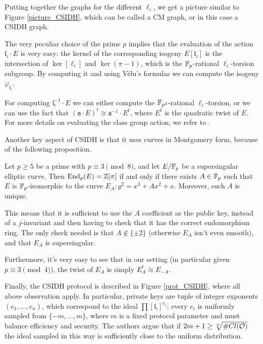 Putting together the graphs for the different $\ell_i$, we get a picture similar to Figure \ref{picture_CSIDH}, which can be called a CM graph, or in this case a CSIDH graph.

The very peculiar choice of the prime $p$ implies that the evaluation of the action $\mathfrak{l}_i\cdot E$ is very easy: the kernel of the corresponding isogeny $E[\mathfrak{l}_i]$ is the intersection of $\ker[\ell_i]$ and $\ker(\pi-1)$, which is the $\mathbb{F}_p$-rational $\ell_i$-torsion subgroup. By computing it and using Vélu's formulas we can compute the isogeny $\varphi_{\mathfrak{l}_i}$.

For computing $\mathfrak{l}_i^{-1}\cdot E$ we can either compute the $\mathbb{F}_{p^2}$-rational $\ell_i$-torsion, or we can use the fact that $(\mathfrak{a}\cdot E)^t\cong\mathfrak{a}^{-1}\cdot E^t$, where $E^t$ is the quadratic twist of $E$. For more details on evaluating the class group action, we refer to \cite[section 8]{CSIDH}.

Another key aspect of CSIDH is that it uses curves in Montgomery form, because of the following proposition.
\begin{proposition}
    Let $p\ge5$ be a prime with $p\equiv3\pmod8$, and let $E/\mathbb{F}_p$ be a supersingular elliptic curve. Then $\operatorname{End}_p(E)=\mathbb{Z}[\pi]$ if and only if there exists $A\in\mathbb{F}_p$ such that $E$ is $\mathbb{F}_p$-isomorphic to the curve $E_A:y^2=x^3+Ax^2+x$. Moreover, such $A$ is unique.
\end{proposition}

This means that it is sufficient to use the $A$ coefficient as the public key, instead of a $j$-invariant and then having to check that it has the correct endomorphism ring. The only check needed is that $A\not\in\{\pm2\}$ (otherwise $E_A$ isn't even smooth), and that $E_A$ is supersingular.

Furthermore, it's very easy to see that in our setting (in particular given $p\equiv3\pmod 4$), the twist of $E_A$ is simply $E_A^t\cong E_{-A}$.

Finally, the CSIDH protocol is described in Figure \ref{prot_CSIDH}, where all above observation apply. In particular, private keys are tuple of integer exponents $(e_1,\dots,e_n)$, which correspond to the ideal $\prod [\mathfrak{l}_i]^{e_i}$; every $e_i$ is uniformly sampled from $\{ -m,\dots,m \}$, where $m$ is a fixed protocol parameter and must balance efficiency and security. The authors argue that if $2m+1\ge\sqrt[n]{\# Cl(\mathcal{O})}$ the ideal sampled in this way is sufficiently close to the uniform distribution.

